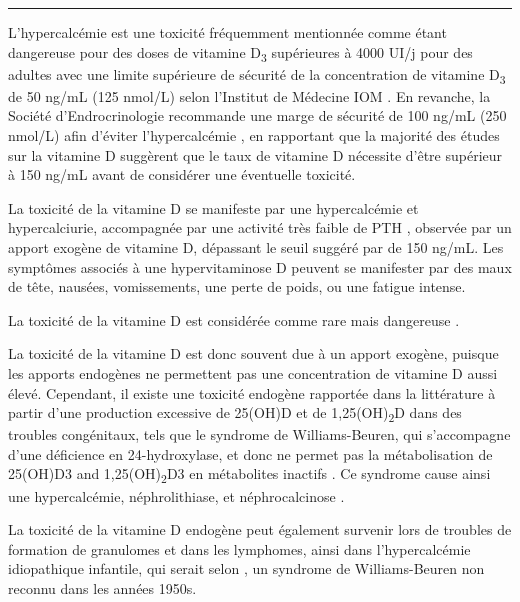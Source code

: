 \documentclass[
  a4paper,
  DIV=11,
  numbers=noendperiod,
  listof=totoc]{scrreprt}
\begin{document}
\begin{center}\rule{0.5\linewidth}{0.5pt}\end{center}

L'hypercalcémie est une toxicité fréquemment mentionnée comme étant
dangereuse pour des doses de vitamine D\textsubscript{3} supérieures à
4000 UI/j pour des adultes avec une limite supérieure de sécurité de la
concentration de vitamine D\textsubscript{3} de 50 ng/mL (125 nmol/L)
selon l'Institut de Médecine \acs{IOM} \autocite{IOM.2011,Holick.2011}.
En revanche, la Société d'Endrocrinologie recommande une marge de
sécurité de 100 ng/mL (250 nmol/L) afin d'éviter l'hypercalcémie
\autocite{Holick.2011}, en rapportant que la majorité des études sur la
vitamine D suggèrent que le taux de vitamine D nécessite d'être
supérieur à 150 ng/mL avant de considérer une éventuelle toxicité.

La toxicité de la vitamine D se manifeste par une hypercalcémie et
hypercalciurie, accompagnée par une activité très faible de PTH
\autocite{Marcinowska-Suchowierska.2018}, observée par un apport exogène
de vitamine D, dépassant le seuil suggéré par \textcite{Holick.2011} de
150 ng/mL. Les symptômes associés à une hypervitaminose D peuvent se
manifester par des maux de tête, nausées, vomissements, une perte de
poids, ou une fatigue intense.

La toxicité de la vitamine D est considérée comme rare mais dangereuse
\autocite{Marcinowska-Suchowierska.2018,Holick.2015}.

La toxicité de la vitamine D est donc souvent due à un apport exogène,
puisque les apports endogènes ne permettent pas une concentration de
vitamine D aussi élevé. Cependant, il existe une toxicité endogène
rapportée dans la littérature à partir d'une production excessive de
25(OH)D et de 1,25(OH)\textsubscript{2}D dans des troubles congénitaux,
tels que le syndrome de Williams-Beuren, qui s'accompagne d'une
déficience en 24-hydroxylase, et donc ne permet pas la métabolisation de
25(OH)D3 and 1,25(OH)\textsubscript{2}D3 en métabolites inactifs
\autocite{Marcinowska-Suchowierska.2018,Holick.2015}. Ce syndrome cause
ainsi une hypercalcémie, néphrolithiase, et néphrocalcinose
\autocite{Azer.2021}.

La toxicité de la vitamine D endogène peut également survenir lors de
troubles de formation de granulomes et dans les lymphomes, ainsi dans
l'hypercalcémie idiopathique infantile, qui serait selon
\textcite{Holick.2015}, un syndrome de Williams-Beuren non reconnu dans
les années 1950s.
\end{document}
